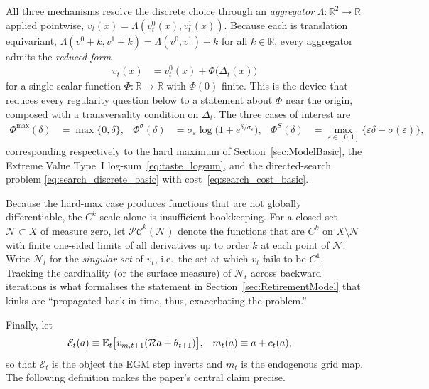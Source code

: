 All three mechanisms resolve the discrete choice through an \emph{aggregator}
$\Lambda:\mathbb{R}^2\to\mathbb{R}$ applied pointwise,
$v_t(x)=\Lambda(v_t^{0}(x),v_t^{1}(x))$. Because each is translation equivariant,
$\Lambda(v^0+k,v^1+k)=\Lambda(v^0,v^1)+k$ for all $k\in\mathbb{R}$, every aggregator
admits the \emph{reduced form}
\begin{align}
v_t(x) &= v_t^{0}(x) + \Phi\big(\Delta_t(x)\big)
\label{eq:reduced_form}
\end{align}
for a single scalar function $\Phi:\mathbb{R}\to\mathbb{R}$ with $\Phi(0)$ finite. This
is the device that reduces every regularity question below to a statement about $\Phi$
near the origin, composed with a transversality condition on $\Delta_t$. The three
cases of interest are
\begin{align}
\Phi^{\max}(\delta) &= \max\{0,\delta\},
&
\Phi^{\sigma}(\delta) &= \sigma_\varepsilon\log\!\big(1+e^{\delta/\sigma_\varepsilon}\big),
&
\Phi^{S}(\delta) &= \max_{\varepsilon\in[0,1]}\big\{\varepsilon\delta-\sigma(\varepsilon)\big\},
\label{eq:three_Phi}
\end{align}
corresponding respectively to the hard maximum of Section~\ref{sec:ModelBasic}, the
Extreme Value Type~I log-sum~\eqref{eq:taste_logsum}, and the directed-search problem
\eqref{eq:search_discrete_basic} with cost~\eqref{eq:search_cost_basic}.

Because the hard-max case produces functions that are not globally differentiable, the
$C^{k}$ scale alone is insufficient bookkeeping. For a closed set
$\mathcal{N}\subset X$ of measure zero, let $\mathcal{PC}^{k}(\mathcal{N})$ denote the
functions that are $C^{k}$ on $X\setminus\mathcal{N}$ with finite one-sided limits of
all derivatives up to order $k$ at each point of $\mathcal{N}$. Write
$\mathcal{N}_t$ for the \emph{singular set} of $v_t$, i.e.\ the set at which $v_t$
fails to be $C^1$. Tracking the cardinality (or the surface measure) of
$\mathcal{N}_t$ across backward iterations is what formalises the statement in
Section~\ref{sec:RetirementModel} that kinks are ``propagated back in time, thus,
exacerbating the problem.''

Finally, let
\begin{align}
\mathcal{E}_t(a) &\equiv \mathbb{E}_t\big[v_{m,t+1}(\mathcal{R}a+\theta_{t+1})\big],
&
m_t(a) &\equiv a + c_t(a),
\end{align}
so that $\mathcal{E}_t$ is the object the EGM step inverts and $m_t$ is the endogenous
grid map. The following definition makes the paper's central claim precise.

